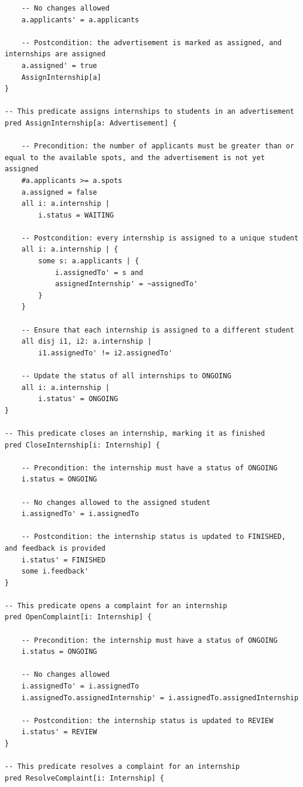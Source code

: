 \begin{lstlisting}
    -- No changes allowed
    a.applicants' = a.applicants

    -- Postcondition: the advertisement is marked as assigned, and internships are assigned
    a.assigned' = true
    AssignInternship[a]
}

-- This predicate assigns internships to students in an advertisement
pred AssignInternship[a: Advertisement] {

    -- Precondition: the number of applicants must be greater than or equal to the available spots, and the advertisement is not yet assigned
    #a.applicants >= a.spots
    a.assigned = false
    all i: a.internship |
        i.status = WAITING

    -- Postcondition: every internship is assigned to a unique student
    all i: a.internship | {
        some s: a.applicants | {
            i.assignedTo' = s and
            assignedInternship' = ~assignedTo'
        }
    }

    -- Ensure that each internship is assigned to a different student
    all disj i1, i2: a.internship |
        i1.assignedTo' != i2.assignedTo'

    -- Update the status of all internships to ONGOING
    all i: a.internship |
        i.status' = ONGOING
}

-- This predicate closes an internship, marking it as finished
pred CloseInternship[i: Internship] {

    -- Precondition: the internship must have a status of ONGOING
    i.status = ONGOING

    -- No changes allowed to the assigned student
    i.assignedTo' = i.assignedTo

    -- Postcondition: the internship status is updated to FINISHED, and feedback is provided
    i.status' = FINISHED
    some i.feedback'
}

-- This predicate opens a complaint for an internship
pred OpenComplaint[i: Internship] {

    -- Precondition: the internship must have a status of ONGOING
    i.status = ONGOING

    -- No changes allowed
    i.assignedTo' = i.assignedTo
    i.assignedTo.assignedInternship' = i.assignedTo.assignedInternship

    -- Postcondition: the internship status is updated to REVIEW
    i.status' = REVIEW
}

-- This predicate resolves a complaint for an internship
pred ResolveComplaint[i: Internship] {


\end{lstlisting}
